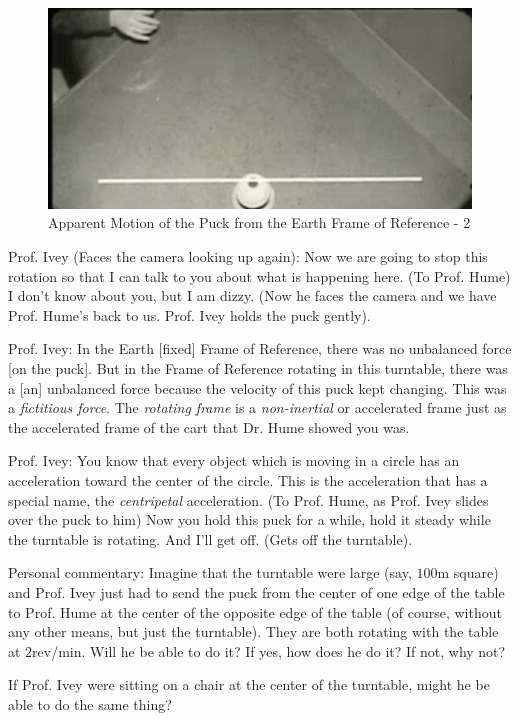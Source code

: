 \documentclass[a6paper]{article}
\newcommand{\perscom}[1]{
    {\footnotesize Personal commentary:  #1}
}
\begin{document}
        \begin{figure}[h!]
            \centering
            \includegraphics[width=0.5\linewidth]{puck-motion-from-earth-frame-of-reference-2.png}
            \caption{Apparent Motion of the Puck from the Earth Frame of Reference - 2}
            \label{fig: puck-motion-from-earth-frame-of-ref-2}
        \end{figure}

Prof. Ivey (Faces the camera looking up again): Now we are going to stop this rotation so that I can talk to you about what is happening here. (To Prof. Hume) I don't know about you, but I am dizzy. (Now he faces the camera and we have Prof. Hume's back to us. Prof. Ivey holds the puck gently).

Prof. Ivey: In the Earth [fixed] Frame of Reference, there was no unbalanced force [on the puck]. But in the Frame of Reference rotating in this turntable, there was a [an] unbalanced force because the velocity of this puck kept changing. This was a \emph{fictitious force}. The \emph{rotating frame} is a \emph{non-inertial} or accelerated frame just as the accelerated frame of the cart that Dr. Hume showed you was. 

Prof. Ivey: You know that every object which is moving in a circle has an acceleration toward the center of the circle. This is the acceleration that has a special name, the \emph{centripetal} acceleration. (To Prof. Hume, as Prof. Ivey slides over the puck to him) Now you hold this puck for a while, hold it steady while the turntable is rotating. And I'll get off. (Gets off the turntable).

\perscom{
    Imagine that the turntable were large (say, $100\si\m$ square) and Prof. Ivey just had to send the puck from the center of one edge of the table to Prof. Hume at the center of the opposite edge of the table (of course, without any other means, but just the turntable). They are both rotating with the table at $2$rev/min. Will he be able to do it? If yes, how does he do it? If not, why not?

    If Prof. Ivey were sitting on a chair at the center of the turntable, might he be able to do the same thing?
}
\end{document}
